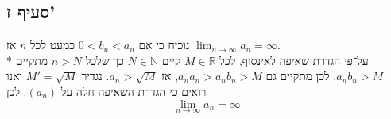 \documentclass[a4paper]{article}
\def\NN{\mathbb{N}}
\def\RR{\mathbb{R}}
\begin{document}
\subsection{סעיף ז'}
נוכיח כי אם $0 < b_n < a_n$ כמעט לכל $n$ אז $\lim_{n \to \infty} a_n = \infty$. \\*
על־פי הגדרת שאיפה לאינסוף, לכל $M \in \RR$ קיים $N \in \NN$ כך שלכל $n > N$ מתקיים $a_n b_n > M$.
לכן מתקיים גם $a_n a_n > a_n b_n > M$, אז $a_n > \sqrt{M}$. נגדיר $M' = \sqrt{M}$ ואנו רואים כי הגדרת השאיפה חלה על $(a_n)$.
לכן
\[
	\lim_{n \to \infty} a_n = \infty
\]
\end{document}
